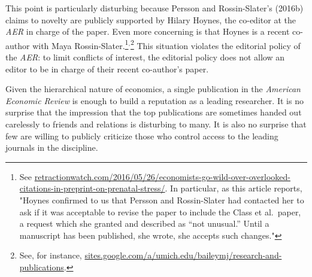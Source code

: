 \documentclass[a4paper,12pt]{article}
\begin{document}


 This point is particularly disturbing because Persson and Rossin-Slater's (2016b) claims to novelty are publicly supported by Hilary Hoynes, the co-editor at the  \emph{AER} in charge of the paper. Even more concerning is that Hoynes is a recent co-author with Maya Rossin-Slater.\footnote{See \href{http://retractionwatch.com/2016/05/26/economists-go-wild-over-overlooked-citations-in-preprint-on-prenatal-stress/}{retractionwatch.com/2016/05/26/economists-go-wild-over-overlooked-citations-in-preprint-on-prenatal-stress/}. In particular, as this article reports, "Hoynes confirmed to us that Persson and Rossin-Slater had contacted her to ask if it was acceptable to revise the paper to include the Class et al.\ paper, a request which she granted and described as “not unusual.” Until a manuscript has been published, she wrote, she accepts such changes."}$^{,} $\footnote{See, for instance, \href{http://sites.google.com/a/umich.edu/baileymj/research-and-publications}{sites.google.com/a/umich.edu/baileymj/research-and-publications}.} This situation violates the editorial policy of the \emph{AER}: to limit conflicts of interest, the editorial policy does not allow an editor to be in charge of their recent co-author's paper. 
 
Given the hierarchical nature of economics, a single publication in the \emph{American Economic Review} is enough to build a reputation as a leading researcher.  It is no surprise that the impression that the top publications are sometimes handed out carelessly to friends and relations is disturbing to many. It is also no surprise that  few  are willing to publicly criticize those who control access to the leading journals in the discipline. 
\end{document}
